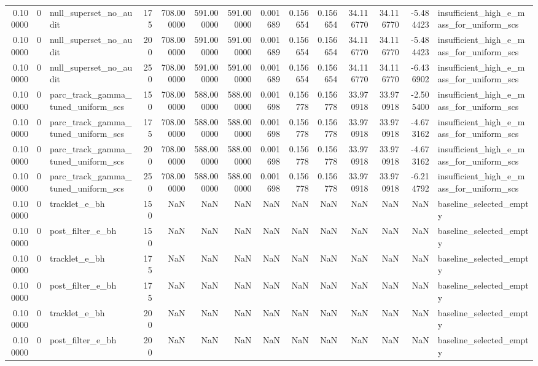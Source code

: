 \begin{tabular}{rrlrrrrrrrrrrl}
0.100000 & 0 & null_superset_no_audit & 175 & 708.000000 & 591.000000 & 591.000000 & 0.001689 & 0.156654 & 0.156654 & 34.116770 & 34.116770 & -5.484423 & insufficient_high_e_mass_for_uniform_scs \\
0.100000 & 0 & null_superset_no_audit & 200 & 708.000000 & 591.000000 & 591.000000 & 0.001689 & 0.156654 & 0.156654 & 34.116770 & 34.116770 & -5.484423 & insufficient_high_e_mass_for_uniform_scs \\
0.100000 & 0 & null_superset_no_audit & 250 & 708.000000 & 591.000000 & 591.000000 & 0.001689 & 0.156654 & 0.156654 & 34.116770 & 34.116770 & -6.436902 & insufficient_high_e_mass_for_uniform_scs \\
0.100000 & 0 & parc_track_gamma_tuned_uniform_scs & 150 & 708.000000 & 588.000000 & 588.000000 & 0.001698 & 0.156778 & 0.156778 & 33.970918 & 33.970918 & -2.505400 & insufficient_high_e_mass_for_uniform_scs \\
0.100000 & 0 & parc_track_gamma_tuned_uniform_scs & 175 & 708.000000 & 588.000000 & 588.000000 & 0.001698 & 0.156778 & 0.156778 & 33.970918 & 33.970918 & -4.673162 & insufficient_high_e_mass_for_uniform_scs \\
0.100000 & 0 & parc_track_gamma_tuned_uniform_scs & 200 & 708.000000 & 588.000000 & 588.000000 & 0.001698 & 0.156778 & 0.156778 & 33.970918 & 33.970918 & -4.673162 & insufficient_high_e_mass_for_uniform_scs \\
0.100000 & 0 & parc_track_gamma_tuned_uniform_scs & 250 & 708.000000 & 588.000000 & 588.000000 & 0.001698 & 0.156778 & 0.156778 & 33.970918 & 33.970918 & -6.214792 & insufficient_high_e_mass_for_uniform_scs \\
0.100000 & 0 & tracklet_e_bh & 150 & NaN & NaN & NaN & NaN & NaN & NaN & NaN & NaN & NaN & baseline_selected_empty \\
0.100000 & 0 & post_filter_e_bh & 150 & NaN & NaN & NaN & NaN & NaN & NaN & NaN & NaN & NaN & baseline_selected_empty \\
0.100000 & 0 & tracklet_e_bh & 175 & NaN & NaN & NaN & NaN & NaN & NaN & NaN & NaN & NaN & baseline_selected_empty \\
0.100000 & 0 & post_filter_e_bh & 175 & NaN & NaN & NaN & NaN & NaN & NaN & NaN & NaN & NaN & baseline_selected_empty \\
0.100000 & 0 & tracklet_e_bh & 200 & NaN & NaN & NaN & NaN & NaN & NaN & NaN & NaN & NaN & baseline_selected_empty \\
0.100000 & 0 & post_filter_e_bh & 200 & NaN & NaN & NaN & NaN & NaN & NaN & NaN & NaN & NaN & baseline_selected_empty \\

\end{tabular}
